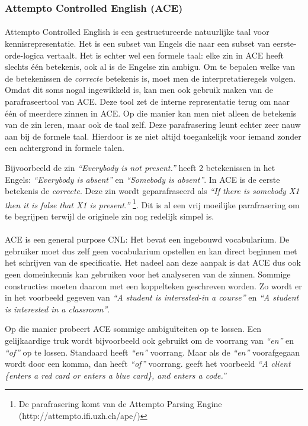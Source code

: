 \documentclass[]{article}
\theoremstyle{definition}
\newcommand{\example}[1]{\textit{``#1''}}
\begin{document}
\subsubsection{Attempto Controlled English (ACE)}
\paragraph{} Attempto Controlled English \cite{Fuchs2008} is een gestructureerde natuurlijke taal voor kennisrepresentatie. Het is een subset van Engels die naar een subset van eerste-orde-logica vertaalt. Het is echter wel een formele taal: elke zin in ACE heeft slechts één betekenis, ook al is de Engelse zin ambigu. Om te bepalen welke van de betekenissen de \textit{correcte} betekenis is, moet men de interpretatieregels volgen. Omdat dit soms nogal ingewikkeld is, kan men ook gebruik maken van de parafraseertool van ACE. Deze tool zet de interne representatie terug om naar één of meerdere zinnen in ACE. Op die manier kan men niet alleen de betekenis van de zin leren, maar ook de taal zelf. Deze parafrasering leunt echter zeer nauw aan bij de formele taal. Hierdoor is ze niet altijd toegankelijk voor iemand zonder een achtergrond in formele talen.

Bijvoorbeeld de zin \example{Everybody is not present.} heeft 2 betekenissen in het Engels: \example{Everybody is absent} en \example{Somebody is absent}. In ACE is de eerste betekenis de \textit{correcte}. Deze zin wordt geparafraseerd als \example{If there is somebody X1 then it is false that X1 is present.} \footnote{De parafrasering komt van de Attempto Parsing Engine (http://attempto.ifi.uzh.ch/ape/)}. Dit is al een vrij moeilijke parafrasering om te begrijpen terwijl de originele zin nog redelijk simpel is.

\paragraph{}ACE is een general purpose CNL: Het bevat een ingebouwd vocabularium. De gebruiker moet dus zelf geen vocabularium opstellen en kan direct beginnen met het schrijven van de specificatie. Het nadeel aan deze aanpak is dat ACE dus ook geen domeinkennis kan gebruiken voor het analyseren van de zinnen. Sommige constructies moeten daarom met een koppelteken geschreven worden. Zo wordt er in \cite{ACEConstructionRules} het voorbeeld gegeven van \example{A student is interested-in a course} en \example{A student is interested in a classroom}.

Op die manier probeert ACE sommige ambiguïteiten op te lossen. Een gelijkaardige truk wordt bijvoorbeeld ook gebruikt om de voorrang van \example{en} en \example{of} op te lossen. Standaard heeft \example{en} voorrang. Maar als de \example{en} voorafgegaan wordt door een komma, dan heeft \example{of} voorrang. \cite{ACEConstructionRules} geeft het voorbeeld \example{A client \{enters a red card or enters a blue card\}, and enters a code.}
\end{document}
